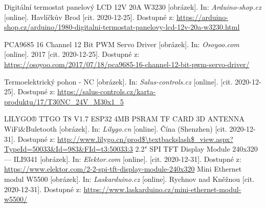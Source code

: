 \begin{thebibliography}{3}
Digitální termostat panelový LCD 12V 20A W3230 [obrázek]. In: \textit{Arduino-shop.cz} [online]. Havlíčkův Brod [cit. 2020-12-25]. Dostupné z: \url{https://arduino-shop.cz/arduino/1980-digitalni-termostat-panelovy-lcd-12v-20a-w3230.html}

PCA9685 16 Channel 12 Bit PWM Servo Driver [obrázek]. In: \textit{Osoyoo.com} [online]. 2017 [cit. 2020-12-25]. Dostupné z: \url{https://osoyoo.com/2017/07/18/pca9685-16-channel-12-bit-pwm-servo-driver/}

Termoelektrický pohon - NC [obrázek]. In: \textit{Salus-controls.cz} [online]. [cit. 2020-12-25]. Dostupné z: \url{https://salus-controls.cz/karta-produktu/17/T30NC\_24V\_M30x1\_5}

LILYGO® TTGO T8 V1.7 ESP32 4MB PSRAM TF CARD 3D ANTENNA WiFi$\&$Buletooth [obrázek]. In: \textit{Lilygo.cn} [online]. Čína (Shenzhen) [cit. 2020-12-31]. Dostupné z: \url{http://www.lilygo.cn/prod$\textbackslash$_view.aspx?TypeId=50033&Id=983&FId=t3:50033:3}
2.2" SPI TFT Display Module 240x320 --- ILI9341 [obrázek]. In: \textit{Elektor.com} [online]. [cit. 2020-12-31]. Dostupné z: \url{https://www.elektor.com/2-2-spi-tft-display-module-240x320}
Mini Ethernet modul W5500 [obrázek]. In: \textit{Laskarduino.cz} [online]. Rychnov nad Kněžnou [cit. 2020-12-31]. Dostupné z: \url{https://www.laskarduino.cz/mini-ethernet-modul-w5500/}









\end{thebibliography}